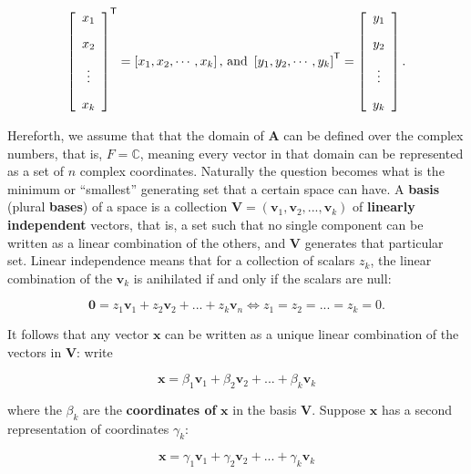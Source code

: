 \begin{equation} \left[\begin{array}{c} x_1 \\[3mm] x_2 \\[3mm] \vdots \\[3mm] x_k \end{array}\right]^{\mathsf{T}} = \left[x_1,x_2,\cdots,x_k\right] \text{, and } \left[y_1,y_2,\cdots,y_k\right]^{\mathsf{T}} =  \left[\begin{array}{c} y_1 \\[3mm] y_2 \\[3mm] \vdots \\[3mm] y_k \end{array}\right] .\end{equation}

	Hereforth, we assume that that the domain of $\mathbf{A}$ can be defined over the complex numbers, that is, $F = \mathbb{C}$, meaning every vector in that domain can be represented as a set of $n$ complex coordinates. Naturally the question becomes what is the minimum or ``smallest'' generating set that a certain space can have. A \textbf{basis} (plural \textbf{bases}) of a space is a collection $\mathbf{V} = \left(\mathbf{v}_1,\mathbf{v}_2,...,\mathbf{v}_k\right)$ of \textbf{linearly independent} vectors, that is, a set such that no single component can be written as a linear combination of the others, and $\mathbf{V}$ generates that particular set. Linear independence means that for a collection of scalars $z_k$, the linear combination of the $\mathbf{v}_k$ is anihilated if and only if the scalars are null:

\begin{equation} \mathbf{0} = z_1 \mathbf{v}_1 + z_2\mathbf{v}_2 + ... + z_k \mathbf{v}_n \Leftrightarrow z_1 = z_2 = ... = z_k = 0.\end{equation}

	It follows that any vector $\mathbf{x}$ can be written as a unique linear combination of the vectors in $\mathbf{V}$: write

\begin{equation} \mathbf{x} = \beta_1 \mathbf{v}_1 + \beta_2\mathbf{v}_2 + ... + \beta_k \mathbf{v}_k \end{equation}

	\noindent where the $\beta_k$ are the \textbf{coordinates of} $\mathbf{x}$ in the basis $\mathbf{V}$. Suppose $\mathbf{x}$ has a second representation of coordinates $\gamma_k$:

\begin{equation} \mathbf{x} = \gamma_1 \mathbf{v}_1 + \gamma_2\mathbf{v}_2 + ... + \gamma_k \mathbf{v}_k \end{equation}

